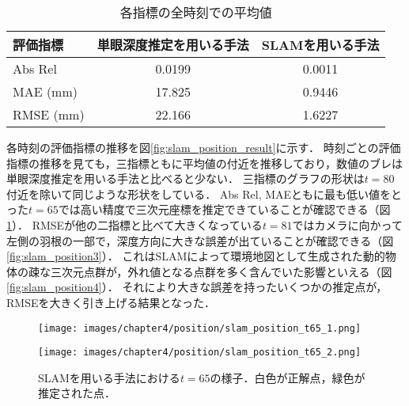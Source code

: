 \begin{table}[H]
	\caption{各指標の全時刻での平均値}
	\label{table:compare_position}
	\centering
	\begin{tabular}{lcc}
		\hline
		評価指標  & 単眼深度推定を用いる手法  &  SLAMを用いる手法  \\
		\hline \hline
		Abs Rel  & 0.0199 & 0.0011 \\
		\hline
		MAE (mm)  & 17.825 & 0.9446 \\
		\hline
		RMSE (mm)  & 22.166 & 1.6227 \\
		\hline
	\end{tabular}
\end{table}
\begin{comment}
\hline
評価指標  & 単眼深度推定を用いる手法  &  SLAMを用いる手法  \\
\hline \hline
Abs Rel  & 0.01992644 & 0.001059725 \\
\hline
MAE (mm)  & 17.825 & 0.9446875 \\
\hline
RMSE (mm)  & 22.16625 & 1.62275 \\
\hline
\end{comment}
各時刻の評価指標の推移を図\ref{fig:slam_position_result}に示す．
時刻ごとの評価指標の推移を見ても，三指標ともに平均値の付近を推移しており，数値のブレは単眼深度推定を用いる手法と比べると少ない．
三指標のグラフの形状は$t=80$付近を除いて同じような形状をしている．
Abs Rel, MAEともに最も低い値をとった$t=65$では高い精度で三次元座標を推定できていることが確認できる（図\ref{fig:slam_position2}）．
RMSEが他の二指標と比べて大きくなっている$t=81$ではカメラに向かって左側の羽根の一部で，深度方向に大きな誤差が出ていることが確認できる（図\ref{fig:slam_position3}）．
これはSLAMによって環境地図として生成された動的物体の疎な三次元点群が，外れ値となる点群を多く含んでいた影響といえる（図\ref{fig:slam_position4}）．
それにより大きな誤差を持ったいくつかの推定点が，RMSEを大きく引き上げる結果となった．

\begin{figure}[h]
	\centering
	\begin{minipage}[b]{0.45\hsize}
		\centering
		\texttt{[image: images/chapter4/position/slam\_position\_t65\_1.png]}
		\label{fig:slam_position_t65_1}
	\end{minipage}
	\begin{minipage}[b]{0.45\hsize}
		\centering
		\texttt{[image: images/chapter4/position/slam\_position\_t65\_2.png]}
		\label{fig:slam_position_t65_2}
	\end{minipage}
	\caption[SLAMを用いる手法における$t=65$の様子]{SLAMを用いる手法における$t=65$の様子．白色が正解点，緑色が推定された点．}
	\label{fig:slam_position2}
\end{figure}

